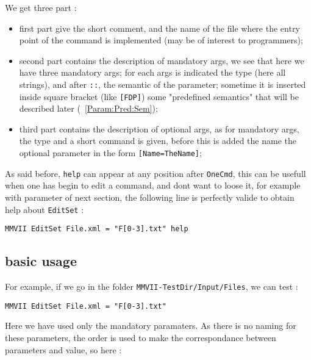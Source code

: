 We get three part :


\begin{itemize}
   \item  first part give the short comment, and the name of the \CPP file where
          the entry point of the command is implemented (may be of interest to programmers);

   \item  second part contains the description of mandatory args, we see that here we
          have three mandatory args;  for each args is indicated the type (here all strings),
          and  after {\tt ::}, the semantic of the parameter;
          sometime it is inserted  inside square bracket (like {\tt [FDP]}) some "predefined semantics"
          that will be described later (~\ref{Param:Pred:Sem});

   \item  third part contains the description of optional args, as for mandatory args, 
          the type and a short command is given, before this is added the name the optional
          parameter in the form {\tt [Name=TheName]};
\end{itemize}



As said before, {\tt help} can appear at any position after {\tt OneCmd}, this can be 
usefull when one has begin to edit a command, and dont want to loose it, for example
with parameter of next section, the following line is perfectly valide to obtain
help about   {\tt EditSet} :

\begin{verbatim}
MMVII EditSet File.xml = "F[0-3].txt" help
\end{verbatim}


\subsection{basic usage}

For example, if we go in the folder  {\tt {\MMVIDIR}MMVII-TestDir/Input/Files}, we can test :

\begin{verbatim}
MMVII EditSet File.xml = "F[0-3].txt"
\end{verbatim}

Here we have used  only the mandatory paramaters. As there is no naming for these parameters,
the order is used to make the correspondance between parameters
and value, so here :

